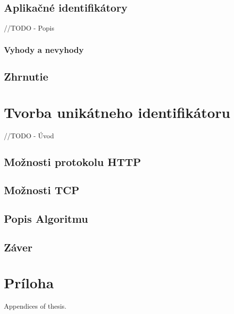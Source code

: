 \documentclass[
  printed, %
  table,   %
  lof,     %
  lot,     %
]{fithesis3}
\begin{document}
\section{Aplikačné identifikátory}
//TODO - Popis
\subsection{Vyhody a nevyhody}
\section{Zhrnutie}

\chapter{Tvorba unikátneho identifikátoru}
\label{ch:footprint}
//TODO - Úvod
\section{Možnosti protokolu HTTP}
\section{Možnosti TCP}
\section{Popis Algoritmu}

\section{Záver}

\makeatletter\thesis@blocks@clear\makeatother
{} %
\printindex

\appendix %
\chapter{Príloha}
Appendices of thesis.
\end{document}
